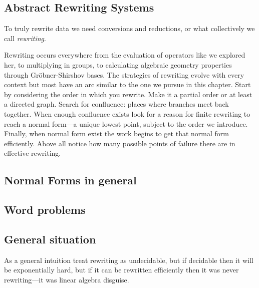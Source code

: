 \subsection{Abstract Rewriting Systems}
To truly rewrite data we need 
conversions and reductions, or what collectively we call \emph{rewriting}.

Rewriting 
occurs everywhere from the evaluation of operators like we explored her, 
to multiplying in groups, to calculating algebraic geometry properties through 
Gr\"obner-Shirshov bases.  The strategies of rewriting evolve with every context 
but most have an arc similar to the one we pursue in this chapter.  Start by 
considering the order in which you rewrite.  Make it a partial order or at 
least a directed graph.  Search for confluence: places where branches meet back
together.  When enough confluence exists look for a reason for finite rewriting 
to reach a normal form---a unique lowest point, subject to the order we introduce.
Finally, when normal form exist the work begins to get that normal form efficiently.
Above all notice how many possible points of failure there are in effective 
rewriting.  

\subsection{Normal Forms in general}

\subsection{Word problems}

\subsection{General situation}

As a general intuition treat rewriting as undecidable, but if decidable 
then it will be exponentially hard, but if it can be rewritten efficiently 
then it was never rewriting---it was linear algebra disguise.